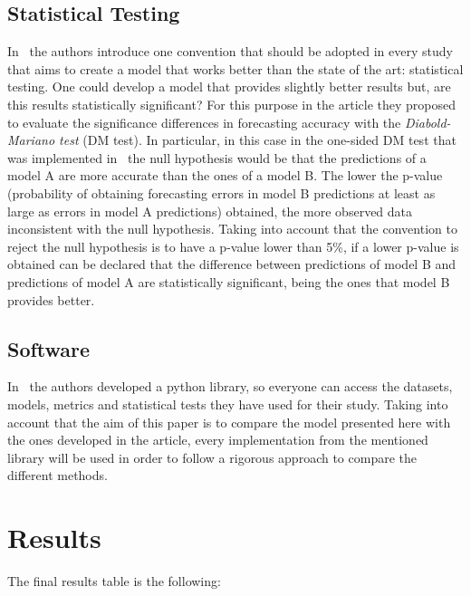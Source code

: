 \documentclass[journal]{IEEEtran}
\begin{document}
\subsection{Statistical Testing}
\label{sec: case study, definition, statical testing}
In~\cite{lagoForecastingDayaheadElectricity2021} the authors introduce one convention that should be adopted in every study that aims to create a model that works better than the state of the art: statistical testing. One could develop a model that provides slightly better results but, are this results statistically significant? For this purpose in the article they proposed to evaluate the significance differences in forecasting accuracy with the \textit{Diabold-Mariano test} (DM test). In particular, in this case in the one-sided DM test that was implemented in~\cite{lagoForecastingDayaheadElectricity2021} the null hypothesis would be that the predictions of a model A are more accurate than the ones of a model B. The lower the p-value (probability of obtaining forecasting errors in model B predictions at least as large as errors in model A predictions) obtained, the more observed data inconsistent with the null hypothesis. Taking into account that the convention to reject the null hypothesis is to have a p-value lower than 5\%, if a lower p-value is obtained can be declared that the difference between predictions of model B and predictions of model A are statistically significant, being the ones that model B provides better.


\subsection{Software}
\label{sec: case study, definition, software}
In~\cite{lagoForecastingDayaheadElectricity2021} the authors developed a python library\cite{WelcomeEpftoolboxDocumentation}, so everyone can access the datasets, models, metrics and statistical tests they have used for their study. Taking into account that the aim of this paper is to compare the model presented here with the ones developed in the article, every implementation from the mentioned library will be used in order to follow a rigorous approach to compare the different methods.


\section{Results}

The final results table is the following:
\end{document}

